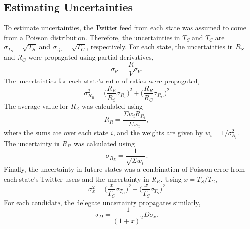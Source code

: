 \documentclass[12pt]{extarticle}
\begin{document}
\subsection{Estimating Uncertainties}
To estimate uncertainties, the Twitter feed from each state was assumed to come from a Poisson distribution.
Therefore, the uncertainties in $T_S$ and $T_C$ are $\sigma_{T_S} = \sqrt{T_S}$ and $\sigma_{T_C} = \sqrt{T_C}$, respectively.
For each state, the uncertainties in $R_S$ and $R_C$ were propagated using partial derivatives,
\begin{equation}
\sigma_R = \frac{R}{V} \sigma_V.
\end{equation}
The uncertainties for each state's ratio of ratios were propagated,
\begin{equation}
\sigma_{R_R}^2 = \Big(\frac{R_R}{R_S} \sigma_{R_S}\Big)^2 + \Big(\frac{R_R}{R_C} \sigma_{R_C}\Big)^2
\end{equation}
The average value for $R_R$ was calculated using
\begin{equation}
	R_R = \frac{\Sigma w_i R_{R_i}}{\Sigma w_i},
\end{equation}
where the sums are over each state $i$, and the weights are given by $w_i = 1 / \sigma_{R_i}^2$.
The uncertainty in $R_R$ was calculated using
\begin{equation}
\sigma_{R_R} = \frac{1}{\sqrt{\Sigma w_i}}.
\end{equation}
Finally, the uncertainty in future states was a combination of Poisson error from each state's Twitter users and the uncertainty in $R_R$.
Using $x = T_S / T_C$,
\begin{equation}
	\sigma_x^2 = \Big(\frac{x}{T_C} \sigma_{T_C}\Big)^2 + \Big(\frac{x}{T_S} \sigma_{T_S}\Big)^2
\end{equation}
For each candidate, the delegate uncertainty propagates similarly,
\begin{equation}
\sigma_D = \frac{1}{(1+x)^2} D \sigma_x.
\end{equation}
\end{document}
